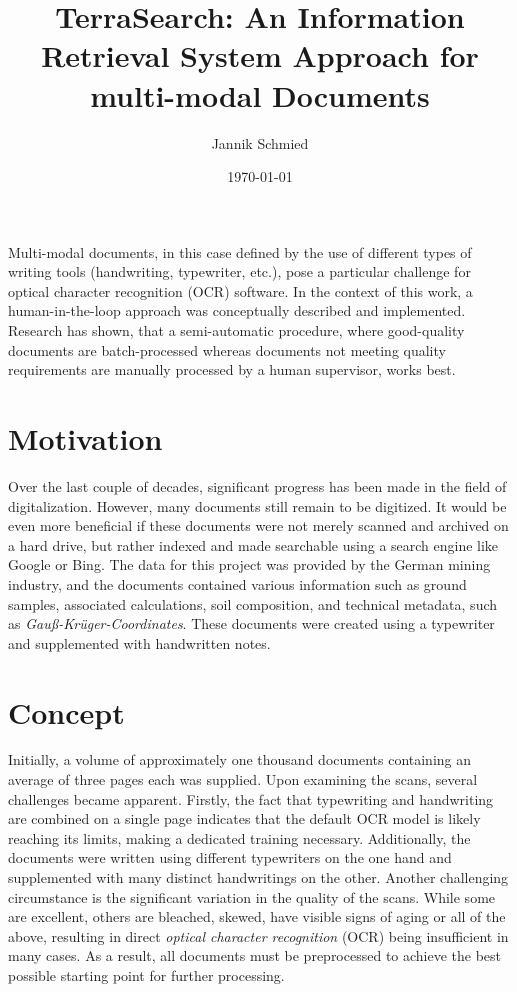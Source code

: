 \documentclass[12pt]{article}
\title{TerraSearch: An Information Retrieval System Approach for multi-modal Documents}
\author{Jannik Schmied}
\date{\today}
\begin{document}
\maketitle

\textbf{\abstractname}

Multi-modal documents, in this case defined by the use of different types of writing tools (handwriting, typewriter, etc.), pose a particular challenge for optical character recognition (OCR) software. In the context of this work, a human-in-the-loop approach was conceptually described and implemented. Research has shown, that a semi-automatic procedure, where good-quality documents are batch-processed whereas documents not meeting quality requirements are manually processed by a human supervisor, works best.


\section{Motivation}
\label{sec:motivation}

Over the last couple of decades, significant progress has been made in the field of digitalization. However, many documents still remain to be digitized. It would be even more beneficial if these documents were not merely scanned and archived on a hard drive, but rather indexed and made searchable using a search engine like Google or Bing. The data for this project was provided by the German mining industry, and the documents contained various information such as ground samples, associated calculations, soil composition, and technical metadata, such as \textit{Gauß-Krüger-Coordinates}. These documents were created using a typewriter and supplemented with handwritten notes.

\section{Concept}
\label{sec:concept}

Initially, a volume of approximately one thousand documents containing an average of three pages each was supplied. Upon examining the scans, several challenges became apparent. Firstly, the fact that typewriting and handwriting are combined on a single page indicates that the default OCR model is likely reaching its limits, making a dedicated training necessary. Additionally, the documents were written using different typewriters on the one hand and supplemented with many distinct handwritings on the other. Another challenging circumstance is the significant variation in the quality of the scans. While some are excellent, others are bleached, skewed, have visible signs of aging or all of the above, resulting in direct \textit{optical character recognition} (OCR) being insufficient in many cases. As a result, all documents must be preprocessed to achieve the best possible starting point for further processing.
\end{document}
